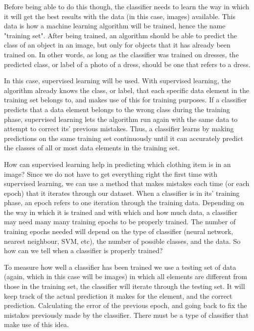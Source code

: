 \documentclass[12pt]{report} %
\begin{document}
	Before being able to do this though, the classifier needs to learn the way in which it will get the best results with the data (in this case, images) available. This data is how a machine learning algorithm will be trained, hence the name "training set". After being trained, an algorithm should be able to predict the class of an object in an image, but only for objects that it has already been trained on. In other words, as long as the classifier was trained on dresses, the predicted class, or label of a photo of a dress, should be one that refers to a dress. 
	
	In this case, supervised learning will be used. With supervised learning, the algorithm already knows the class, or label, that each specific data element in the training set belongs to, and makes use of this for training purposes. If a classifier predicts that a data element belongs to the wrong class during the training phase, supervised learning lets the algorithm run again with the same data to attempt to correct its' previous mistakes\cite{aurelienMachineLearning}. Thus, a classifier learns by making predictions on the same training set continuously until it can accurately predict the classes of all or most data elements in the training set. 
	
	How can supervised learning help in predicting which clothing item is in an image? Since we do not have to get everything right the first time with supervised learning, we can use a method that makes mistakes each time (or each epoch) that it iterates through our dataset. When a classifier is in its' training phase, an epoch refers to one iteration through the training data. Depending on the way in which it is trained and with which and how much data, a classifier may need many many training epochs to be properly trained. The number of training epochs needed will depend on the  type of classifier (neural network, nearest neighbour, SVM, etc), the number of possible classes, and the data. So how can we tell when a classifier is properly trained? 
	
	To measure how well a classifier has been trained we use a testing set of data (again, which in this case will be images) in which all elements are different from those in the training set, the classifier will iterate through the testing set. It will keep track of the actual prediction it makes for the element, and the correct prediction. Calculating the error of the previous epoch, and going back to fix the mistakes previously made by the classifier. There must be a type of classifier that make use of this idea.
\end{document}
